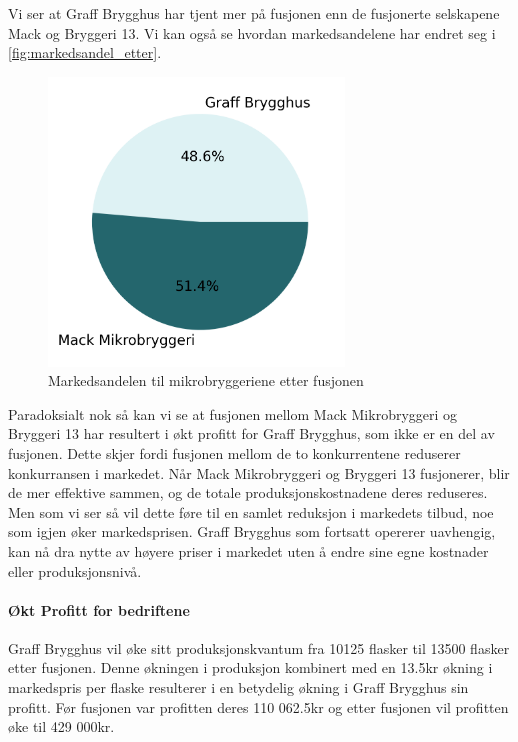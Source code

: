 \documentclass[
  12pt,
  a4paper,
  DIV=11,
  numbers=noendperiod]{scrartcl}
\let\oldparagraph\paragraph
\renewcommand{\paragraph}[1]{\oldparagraph{#1}\mbox{}}
\begin{document}
Vi ser at Graff Brygghus har tjent mer på fusjonen enn de fusjonerte
selskapene Mack og Bryggeri 13. Vi kan også se hvordan markedsandelene
har endret seg i \autoref{fig:markedsandel_etter}.

\begin{figure}[t]
\centering
\includegraphics[width=0.7\textwidth]{dokumentobjekter/figurer/markedsandel_mikrobryggerier_fusjon.png}
\caption{Markedsandelen til mikrobryggeriene etter fusjonen}
\label{fig:markedsandel_etter}
\end{figure}

Paradoksialt nok så kan vi se at fusjonen mellom Mack Mikrobryggeri og
Bryggeri 13 har resultert i økt profitt for Graff Brygghus, som ikke er
en del av fusjonen. Dette skjer fordi fusjonen mellom de to
konkurrentene reduserer konkurransen i markedet. Når Mack Mikrobryggeri
og Bryggeri 13 fusjonerer, blir de mer effektive sammen, og de totale
produksjonskostnadene deres reduseres. Men som vi ser så vil dette føre
til en samlet reduksjon i markedets tilbud, noe som igjen øker
markedsprisen. Graff Brygghus som fortsatt opererer uavhengig, kan nå
dra nytte av høyere priser i markedet uten å endre sine egne kostnader
eller produksjonsnivå.

\paragraph{Økt Profitt for
bedriftene}\label{uxf8kt-profitt-for-bedriftene}

Graff Brygghus vil øke sitt produksjonskvantum fra 10125 flasker til
13500 flasker etter fusjonen. Denne økningen i produksjon kombinert med
en 13.5kr økning i markedspris per flaske resulterer i en betydelig
økning i Graff Brygghus sin profitt. Før fusjonen var profitten deres
110 062.5kr og etter fusjonen vil profitten øke til 429 000kr.
\end{document}
